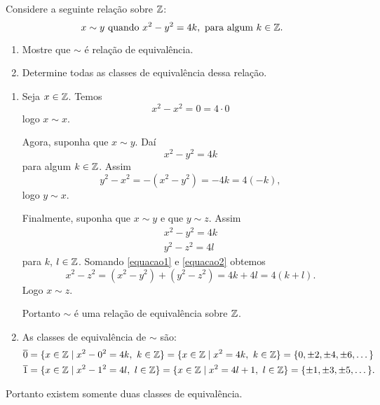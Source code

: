 \documentclass[12pt]{exam}
\begin{document}
    \questao{} Considere a seguinte relação sobre $\mathbb{Z}$:
    \[
    x \sim y \mbox{ quando }  x^2 - y^2 = 4k, \mbox{ para algum } k \in \mathbb{Z}.
    \]

    \begin{enumerate}[label={\alph*})]
        \item Mostre que $\sim$ é relação de equivalência.

        \item Determine todas as classes de equivalência dessa relação.
    \end{enumerate}

        \solucao
    \begin{enumerate}[label={\alph*})]
        \item Seja $x \in \mathbb{Z}$. Temos
        \[
        x^2 - x^2 = 0 = 4\cdot 0
        \]
        logo $x \sim x$.

        Agora, suponha que $x \sim y$. Daí
        \[
        x^2 - y^2 = 4k
        \]
        para algum $k \in \mathbb{Z}$. Assim
        \[
        y^2 - x^2 = -(x^2 - y^2) = -4k = 4(-k),
        \]
        logo $y \sim x$.

        Finalmente, suponha que $x \sim y$ e que $y \sim z$. Assim
        \begin{align}
            x^2 - y^2 = 4k\label{equacao1}\\
            y^2 - z^2 = 4l\label{equacao2}
        \end{align}
        para $k$, $l \in \mathbb{Z}$. Somando \eqref{equacao1} e \eqref{equacao2} obtemos
        \[
        x^2 - z^2 = (x^2 - y^2) + (y^2 - z^2) = 4k + 4l = 4(k + l).
        \]
        Logo $x \sim z$.

        Portanto $\sim$ é uma relação de equivalência sobre $\mathbb{Z}$.

        \item As classes de equivalência de $\sim$ são:
        \begin{align*}
            \overline{0} &= \{x \in \mathbb{Z} \mid x^2 - 0^2 = 4k,\ k \in \mathbb{Z}\} = \{x \in \mathbb{Z} \mid x^2 = 4k,\ k \in \mathbb{Z}\} = \{0, \pm 2, \pm 4, \pm 6, \dots\}\\
            \overline{1} &= \{x \in \mathbb{Z} \mid x^2 - 1^2 = 4l,\ l \in \mathbb{Z}\} = \{x \in \mathbb{Z} \mid x^2 = 4l + 1,\ l \in \mathbb{Z}\} = \{\pm 1, \pm 3, \pm 5, \dots\}.
        \end{align*}
    \end{enumerate}

    Portanto existem somente duas classes de equivalência.
\end{document}
